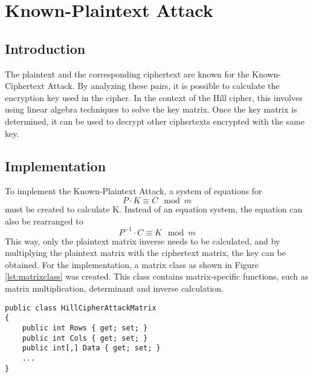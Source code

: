 \documentclass[conference]{IEEEtran}
\begin{document}
\section{Known-Plaintext Attack}
\subsection{Introduction}
The plaintext and the corresponding ciphertext are known for the Known-Ciphertext Attack. By analyzing these pairs, it is possible to calculate the encryption key used in the cipher. In the context of the Hill cipher, this involves using linear algebra techniques to solve the key matrix. Once the key matrix is determined, it can be used to decrypt other ciphertexts encrypted with the same key.
\subsection{Implementation}
To implement the Known-Plaintext Attack, a system of equations for \[P \cdot K \equiv C \mod m\] must be created to calculate K.
Instead of an equation system, the equation can also be rearranged to \[P^{-1} \cdot C \equiv K \mod m\] This way, only the plaintext matrix inverse\cite{b2} needs to be calculated, and by multiplying the plaintext matrix with the ciphertext matrix, the key can be obtained.
For the implementation, a matrix class as shown in Figure \ref{lst:matrixclass} was created. This class contains matrix-specific functions, such as matrix multiplication, determinant and inverse calculation.
\\
\begin{lstlisting}[caption={HillCipherAttackMatrix class}, label={lst:matrixclass}]
public class HillCipherAttackMatrix
{
    public int Rows { get; set; }
    public int Cols { get; set; }
    public int[,] Data { get; set; }
    ...
}
\end{lstlisting}
\end{document}
